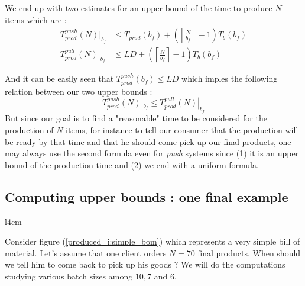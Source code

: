 We end up with two estimates for an upper bound of the time to produce $N$ items which are : 
\[
    \begin{split}
        T_{prod}^{push}(N)|_{b_f} &\le T_{prod}(b_f) + \left( \left\lceil \frac{N}{b_f} \right\rceil - 1 \right)T_b(b_f)\\
        T_{prod}^{pull}(N)|_{b_f} &\le LD + \left( \left\lceil \frac{N}{b_f}\right\rceil - 1 \right) T_b(b_f)
    \end{split}
\]

And it can be easily seen that $T_{prod}^{push}(b_f) \le LD$ which imples the following relation between our two upper bounds : 
\[ T_{prod}^{push}(N)|_{b_f} \le T_{prod}^{pull}(N)|_{b_f} \]
But since our goal is to find a "reasonable" time to be considered for the production of $N$ items, for instance to tell our consumer that the production will be ready by that time and that he should come pick up our final products, one may always use the second formula even for \textit{push} systems since (1) it is an upper bound of the production time and (2) we end with a uniform formula. 

\subsection{Computing upper bounds : one final example}

\begin{wrapfigure}[14]{l}{4cm}
    \centering
    \caption{\label{produced_i:simple_bom}Example}
\end{wrapfigure}

Consider figure (\ref{produced_i:simple_bom}) which represents a very simple bill of material. Let's assume that one client orders $N = 70$ final products. When should we tell him to come back to pick up his goods ? We will do the computations studying various batch sizes among $10, 7$ and $6$. 

